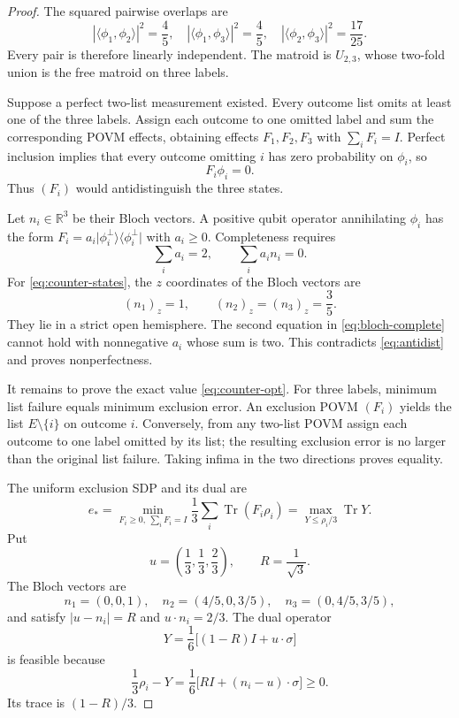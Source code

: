 \documentclass[11pt]{article}
\theoremstyle{definition}
\theoremstyle{remark}
\newcommand{\Tr}{\operatorname{Tr}}
\newcommand{\ket}[1]{\lvert #1\rangle}
\newcommand{\bra}[1]{\langle #1\rvert}
\begin{document}
\begin{proof}
The squared pairwise overlaps are
\begin{equation}\label{eq:counter-overlaps}
 |\langle\phi_1,\phi_2\rangle|^2=\frac45,
 \quad |\langle\phi_1,\phi_3\rangle|^2=\frac45,
 \quad |\langle\phi_2,\phi_3\rangle|^2=\frac{17}{25}.
\end{equation}
Every pair is therefore linearly independent.  The matroid is $U_{2,3}$,
whose two-fold union is the free matroid on three labels.

Suppose a perfect two-list measurement existed.  Every outcome list omits at
least one of the three labels.  Assign each outcome to one omitted label and
sum the corresponding POVM effects, obtaining effects $F_1,F_2,F_3$ with
$\sum_iF_i=I$.  Perfect inclusion implies that every outcome omitting $i$
has zero probability on $\phi_i$, so
\begin{equation}\label{eq:antidist}
 F_i\phi_i=0.
\end{equation}
Thus $(F_i)$ would antidistinguish the three states.

Let $n_i\in\mathbb R^3$ be their Bloch vectors.  A positive qubit operator
annihilating $\phi_i$ has the form
$F_i=a_i\ket{\phi_i^\perp}\!\bra{\phi_i^\perp}$ with $a_i\geq0$.
Completeness requires
\begin{equation}\label{eq:bloch-complete}
 \sum_i a_i=2,\qquad \sum_i a_i n_i=0.
\end{equation}
For \eqref{eq:counter-states}, the $z$ coordinates of the Bloch vectors are
\begin{equation}\label{eq:zpositive}
 (n_1)_z=1,\qquad(n_2)_z=(n_3)_z=\frac35.
\end{equation}
They lie in a strict open hemisphere.  The second equation in
\eqref{eq:bloch-complete} cannot hold with nonnegative $a_i$ whose sum is
two.  This contradicts \eqref{eq:antidist} and proves nonperfectness.

It remains to prove the exact value \eqref{eq:counter-opt}.  For three labels,
minimum list failure equals minimum exclusion error.  An exclusion POVM
$(F_i)$ yields the list $E\setminus\{i\}$ on outcome $i$.  Conversely, from
any two-list POVM assign each outcome to one label omitted by its list; the
resulting exclusion error is no larger than the original list failure.
Taking infima in the two directions proves equality.

The uniform exclusion SDP and its dual are
\begin{equation}\label{eq:exclusion-sdp}
 e_*=\min_{F_i\geq0,\ \sum_iF_i=I}
 \frac13\sum_i\Tr(F_i\rho_i)
 =\max_{Y\leq\rho_i/3}\Tr Y.
\end{equation}
Put
\[
 u=\left(\frac13,\frac13,\frac23\right),\qquad
 R=\frac1{\sqrt3}.
\]
The Bloch vectors are
\[
 n_1=(0,0,1),\quad n_2=(4/5,0,3/5),\quad
 n_3=(0,4/5,3/5),
\]
and satisfy $|u-n_i|=R$ and $u\cdot n_i=2/3$.  The dual operator
\begin{equation}\label{eq:dual-Y}
 Y=\frac16\bigl[(1-R)I+u\cdot\sigma\bigr]
\end{equation}
is feasible because
\[
 \frac13\rho_i-Y
 =\frac16\bigl[R I+(n_i-u)\cdot\sigma\bigr]\geq0.
\]
Its trace is $(1-R)/3$.


\end{proof}
\end{document}
